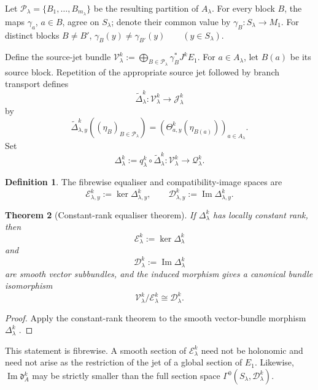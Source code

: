 \documentclass[11pt]{article}
\theoremstyle{plain}
\newtheorem{theorem}{Theorem}[section]
\theoremstyle{definition}
\newtheorem{definition}[theorem]{Definition}
\begin{document}
Let \(\mathcal P_\lambda = \{B_1,\ldots,B_{m_\lambda}\}\) be the resulting partition of \(A_\lambda\). For every block \(B\),
the maps \(\gamma_a\), \(a\in B\), agree on \(S_\lambda\); denote their
common value by
\(\gamma_B:S_\lambda\longrightarrow M_1\).
For distinct blocks \(B\neq B'\),
\(\gamma_B(y)\neq\gamma_{B'}(y) \qquad (y\in S_\lambda)\).

Define the source-jet bundle
\(\mathcal V_\lambda^k := \bigoplus_{B\in\mathcal P_\lambda} \gamma_B^*J^kE_1\).
For \(a\in A_\lambda\), let \(B(a)\) be its source block. Repetition
of the appropriate source jet followed by branch transport defines
\[
  \widetilde\Delta_\lambda^k:
  \mathcal V_\lambda^k
  \longrightarrow
  \mathcal J_\lambda^k
\]
by
\[
  \widetilde\Delta_{\lambda,y}^k
  \left(
    (\eta_B)_{B\in\mathcal P_\lambda}
  \right)
  =
  \left(
    \Theta_{a,y}^k
    \left(
      \eta_{B(a)}
    \right)
  \right)_{a\in A_\lambda}.
\]
Set
\[
  \Delta_\lambda^k
  :=
  q_\lambda^k
  \circ
  \widetilde\Delta_\lambda^k:
  \mathcal V_\lambda^k
  \longrightarrow
  \mathcal Q_\lambda^k.
\]

\begin{definition}
The fibrewise equaliser and compatibility-image spaces are
\[
  \mathcal E_{\lambda,y}^k
  :=
  \ker\Delta_{\lambda,y}^k,
  \qquad
  \mathcal D_{\lambda,y}^k
  :=
  \operatorname{Im}\Delta_{\lambda,y}^k.
\]
\end{definition}

\begin{theorem}[Constant-rank equaliser theorem]
\label{thm:constant-rank-equaliser}
If \(\Delta_\lambda^k\) has locally constant rank, then
\[
  \mathcal E_\lambda^k
  :=
  \ker\Delta_\lambda^k
\]
and
\[
  \mathcal D_\lambda^k
  :=
  \operatorname{Im}\Delta_\lambda^k
\]
are smooth vector subbundles, and the induced morphism gives a
canonical bundle isomorphism
\[
  \mathcal V_\lambda^k/
  \mathcal E_\lambda^k
  \cong
  \mathcal D_\lambda^k.
\]
\end{theorem}

\begin{proof}
Apply the constant-rank theorem to the smooth vector-bundle morphism
\(\Delta_\lambda^k\)
\citep{Lee2012SmoothManifolds}.
\end{proof}

This statement is fibrewise. A smooth section of
\(\mathcal E_\lambda^k\) need not be holonomic and need not arise as
the restriction of the jet of a global section of \(E_1\). Likewise, \(\operatorname{Im}\mathfrak d_A^k\) may be strictly smaller than the full section space
\(\Gamma^0(S_\lambda,\mathcal D_\lambda^k)\).
\end{document}

